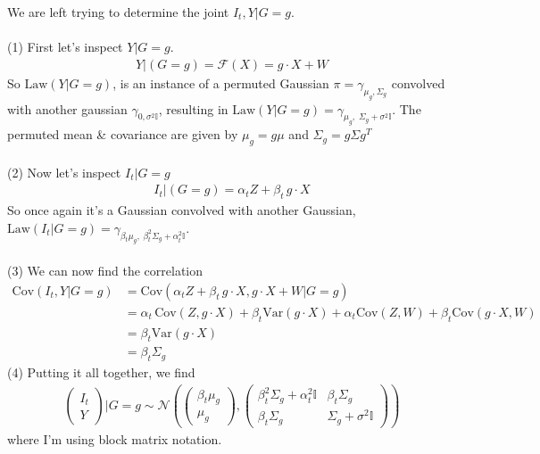 \documentclass[12pt,fleqn]{article}
\numberwithin{equation}{section}
\begin{document}
\begin{sidework}
	We are left trying to determine the joint $I_t , Y | G=g$.\\
	\\
	(1) First let's inspect $Y|G=g$.
	\begin{align}
		Y|(G=g) = \mathcal F(X) = g \cdot X + W
	\end{align}
	So $\text{Law}(Y|G=g)$, is an instance of a permuted Gaussian $\pi = \gamma_{\mu_g, \Sigma_g}$ convolved with another gaussian $\gamma_{0, \sigma^2 \mathbb I}$, resulting in $\text{Law}(Y|G=g) = \gamma_{\mu_g, \; \Sigma_g + \sigma^2 \mathbb I}$. The permuted mean \& covariance are given by $\mu_g = g\mu$ and $\Sigma_g = g \Sigma g^T$\\
	\\
	(2) Now let's inspect $I_t | G=g$
	\begin{align}
		I_t | (G=g)  = \alpha_t Z + \beta_t \, g\cdot X
	\end{align}
	So once again it's a Gaussian convolved with another Gaussian, $\text{Law}(I_t | G=g)= \gamma_{\beta_t \mu_g,\; \beta_t^2\Sigma_g + \alpha_t^2 \mathbb I}$.
	\\
	\\
	(3) We can now find the correlation
	\begin{align}
		\text{Cov}(I_t, Y | G=g) & =  \text{Cov}(\alpha_t Z + \beta_t \, g\cdot X, g \cdot X + W | G =g)\\
		& = \alpha_t \, \text{Cov}(Z, g \cdot X) + \beta_t \text{Var}(g \cdot X)  + \alpha_t \text{Cov}(Z, W) + \beta_t \text{Cov}(g \cdot X, W)\\
		& = \beta_t \text{Var}(g\cdot X)\\
		& = \beta_t \Sigma_g
	\end{align}
	(4) Putting it all together, we find
	\begin{align}
		\begin{pmatrix}
			I_t \\ Y
		\end{pmatrix} \Big |G=g \sim \mathcal N\left( \begin{pmatrix}
			\beta_t \mu_g \\ \mu_g
		\end{pmatrix}, \begin{pmatrix}
			\beta_t^2 \Sigma_g + \alpha_t^2 \mathbb I & \beta_t \Sigma_g \\ \beta_t \Sigma_g & \Sigma_g + \sigma^2 \mathbb I
		\end{pmatrix} \right)
	\end{align}
	where I'm using block matrix notation.
\end{sidework}
\end{document}
